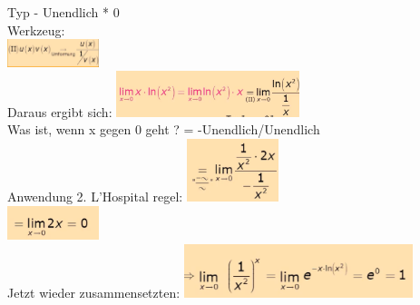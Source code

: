 \documentclass[12pt,a4paper]{article}
\begin{document}
Typ - Unendlich * 0\\
\newpage
Werkzeug:\\
\includegraphics[width=0.2\textwidth]{Bilder/S1/13.png}\\
Daraus ergibt sich:
\includegraphics[width=0.4\textwidth]{Bilder/S1/14.png}\\
Was ist, wenn x gegen 0 geht ? = -Unendlich/Unendlich\\
Anwendung 2. L'Hospital regel:
\includegraphics[width=0.2\textwidth]{Bilder/S1/15.png}\\
\includegraphics[width=0.2\textwidth]{Bilder/S1/16.png}\\
Jetzt wieder zusammensetzten:
\includegraphics[width=0.5\textwidth]{Bilder/S1/17.png}\\
\end{document}
